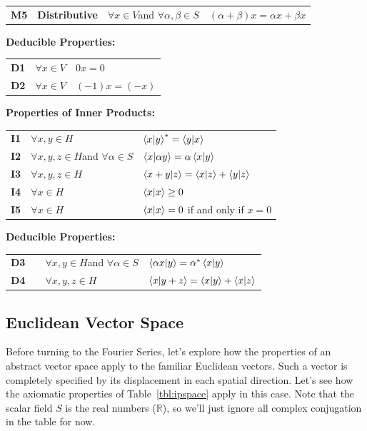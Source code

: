 \documentclass[12pt]{book}
\begin{document}
\begin{table}
\begin{center}
\begin{tabular}{llll}
  {\bf M5} & {\bf Distributive} & $\forall x \in V$and $\forall \alpha,\beta \in S$ & $ (\alpha + \beta)x = \alpha x + \beta x $ \\
\end{tabular}
\vskip 0.5cm
{\bf Deducible Properties:}\\
\begin{tabular}{lll}
{\bf D1}  & $\forall x \in V $  & $0x = 0$ \\
{\bf D2}  & $\forall x \in V $  & $(-1)x = (-x)$ \\
\end{tabular}
\vskip 0.5cm
{\bf Properties of Inner Products:}\\
\begin{tabular}{lll}
  {\bf I1} & $\forall x,y \in H$ & $\braket{x|y}^* = \braket{y|x}$\\
{\bf I2} & $\forall x,y,z \in H$and $\forall \alpha \in S$ &
$\braket{x|\alpha y} = \alpha \braket{x|y}$\\
{\bf I3} & $\forall x,y,z \in H$ & $\braket{x+y|z} = \braket{x|z}+\braket{y|z}$\\
{\bf I4} & $\forall x \in H$ & $\braket{x|x} \geq 0$ \\
{\bf I5} & $\forall x \in H$ & $\braket{x|x}=0$ if and only if $x=0$ \\
\end{tabular}
\vskip 0.5cm
{\bf Deducible Properties:}\\
\begin{tabular}{llll}
{\bf D3} & & $\forall x,y \in H$and $\forall \alpha \in S$ &
$\braket{\alpha x|y} = \alpha^* \braket{x|y}$\\
{\bf D4} & & $\forall x,y,z \in H$ &
$\braket{x|y+z} = \braket{x|y}+\braket{x|z}$\\
\end{tabular}
\end{center}
\end{table}

\subsection{Euclidean Vector Space}

Before turning to the Fourier Series, let's explore how the properties of an abstract vector space apply to the familiar Euclidean vectors.  Such a vector is completely specified by its displacement in each spatial direction.  Let's see how the axiomatic properties of Table~\ref{tbl:ipspace} apply in this case. Note that the scalar field $S$ is the real numbers ($\mathbb{R}$), so we'll just ignore all complex conjugation in the table for now.
\end{document}

